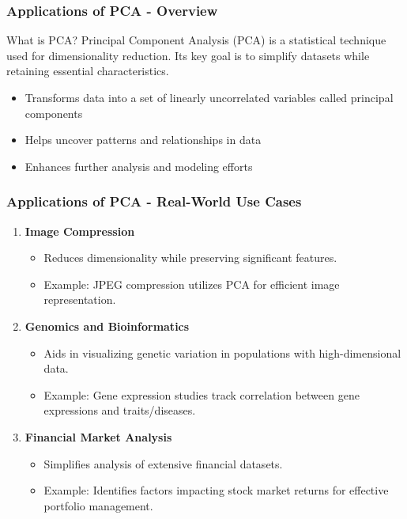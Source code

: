 \documentclass[aspectratio=169]{beamer}
\begin{document}
\begin{frame}[fragile]
    \frametitle{Applications of PCA - Overview}
    \begin{block}{What is PCA?}
        Principal Component Analysis (PCA) is a statistical technique used for dimensionality reduction.
        Its key goal is to simplify datasets while retaining essential characteristics. 
    \end{block}
    \begin{itemize}
        \item Transforms data into a set of linearly uncorrelated variables called principal components
        \item Helps uncover patterns and relationships in data
        \item Enhances further analysis and modeling efforts
    \end{itemize}
\end{frame}

\begin{frame}[fragile]
    \frametitle{Applications of PCA - Real-World Use Cases}
    \begin{enumerate}
        \item \textbf{Image Compression}
        \begin{itemize}
            \item Reduces dimensionality while preserving significant features.
            \item Example: JPEG compression utilizes PCA for efficient image representation.
        \end{itemize}
        
        \item \textbf{Genomics and Bioinformatics}
        \begin{itemize}
            \item Aids in visualizing genetic variation in populations with high-dimensional data.
            \item Example: Gene expression studies track correlation between gene expressions and traits/diseases.
        \end{itemize}
        
        \item \textbf{Financial Market Analysis}
        \begin{itemize}
            \item Simplifies analysis of extensive financial datasets.
            \item Example: Identifies factors impacting stock market returns for effective portfolio management.
        \end{itemize}
    \end{enumerate}
\end{frame}
\end{document}
